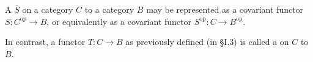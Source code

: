 A  $\bar{S}$ on a category $C$ to a category $B$ may be represented as a covariant functor $S: C^{\text{op}} \to B$, or equivalently as a covariant functor $S^{\text{op}}: C \to B^{\text{op}}$.

In contrast, a functor $T: C \to B$ as previously defined (in \S I.3) is called a  on $C$ to $B$.

